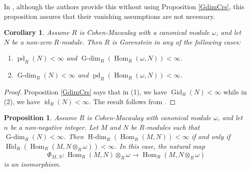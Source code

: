 \documentclass[11pt, a4paper,pagebackref]{amsart}
\numberwithin{equation}{section}
\newtheorem{proposition}[theorem]{Proposition}
\newtheorem{corollary}[theorem]{Corollary}
\theoremstyle{definition}
\newtheorem{remark and definition}[theorem]{Remark and Definition}
\newtheorem{remark and notation}[theorem]{Remark and Notation}
\newcommand\Hom{\operatorname{Hom}}
\begin{document}
In \cite[Corollary 42(3)]{HomologicalDimensionsTheGorensteinPropertyAndSpecialCasesOfSomeConjectures}, although the authors provide this without using Proposition \ref{GdimCrs}, this proposition assures that their vanishing assumptions are not necessary.

\begin{corollary}\label{85aq}
    Assume $R$ is Cohen-Macaulay with a canonical module $\omega$, and let $N$ be a non-zero $R$-module. Then $R$ is Gorenstein in any of the following cases:
    \begin{enumerate}[\rm(1)]
        \item  $\operatorname{pd}_R(N)<\infty$ and $\operatorname{G-dim}_R(\Hom_R(\omega, N))<\infty$.
        \item $\operatorname{G-dim}_R(N)<\infty$ and  $\operatorname{pd}_R(\Hom_R(\omega, N))<\infty$.
    \end{enumerate}
    \end{corollary}
 \begin{proof} Proposition \ref{GdimCrs} says that in (1), we have $\operatorname{Gid}_R(N)<\infty$ while in (2), we have $\operatorname{id}_R(N)<\infty$. The result follows from \cite[Theorem 6.3.2]{GorensteinDimensions}. 
 \end{proof}




\begin{proposition}\label{lemx}
   Assume $R$ is Cohen-Macaulay with canonical module $\omega$, and let $n$ be a non-negative integer. Let $M$ and $N$ be $R$-modules such that $\operatorname{G-dim}_R(N)<\infty$. Then \linebreak  $\operatorname{H-dim}_R(\Hom_R(M,N))<\infty$  if and only if $\operatorname{Hid}_R(\Hom_R(M, N \otimes_R \omega))<\infty$. In this case, the natural map $$\Phi_{M,N}: \Hom_R(M,N) \otimes_R  \omega \to \Hom_R(M, N \otimes_R 
    \omega)$$ is an isomorphism.
\end{proposition}
\end{document}
